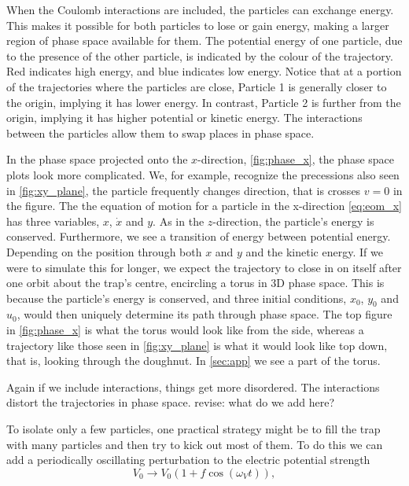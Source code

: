 When the Coulomb interactions are included, the particles can exchange energy. This makes it possible for both particles to lose or gain energy, making
a larger region of phase space available for them.
The potential energy of one particle, due to the presence of the other particle, is indicated by the colour of the trajectory. Red indicates high energy, and blue indicates low energy. Notice that at
a portion of the trajectories where the particles are close, Particle 1 is generally closer to the
origin, implying it has lower energy. In contrast, Particle 2 is further from the origin, implying it has higher potential or kinetic energy. The interactions between the particles allow them to swap places
in phase space.

In the phase space projected onto the $x$-direction, \autoref{fig:phase_x}, the phase space plots look more complicated.
We, for example, recognize the precessions also seen in \autoref{fig:xy_plane}, the particle frequently changes direction, that is
crosses $v=0$ in the figure.
The the equation of motion for a particle in the x-direction \autoref{eq:eom_x} has three variables, $x$, $\dot{x}$ and $y$.
As in the $z$-direction, the particle's energy is conserved. Furthermore, we see a transition of energy between potential energy. 
Depending on the position through both $x$ and $y$ and the kinetic energy. If we were to simulate this for longer, we expect
the trajectory to close in on itself after one orbit about the trap's centre, encircling a torus in 3D phase space. This is because the particle's energy is conserved, and three initial conditions, $x_0$, $y_0$ and $u_0$, would then uniquely determine its path through phase space.
The top figure in \autoref{fig:phase_x} is what the torus would look like from the side, whereas a trajectory like those seen in \autoref{fig:xy_plane} is what it would look like top down, that is, looking through the doughnut.
In \autoref{sec:app} we see a part of the torus.

Again if we include interactions, things get more disordered. The interactions distort the trajectories in phase space.
revise: what do we add here?

To isolate only a few particles, one practical strategy might be to fill the
trap with many particles and then try to kick out most of them. To do this
we can add a periodically oscillating perturbation to the electric potential strength
\begin{equation}
  V_0 \rightarrow V_0(1 + f\cos (\omega_V t)),
  \end{equation}

